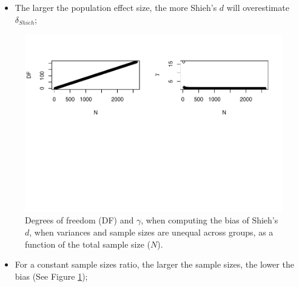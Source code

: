 \documentclass[
  english,
  man,mask]{apa6}
\providecommand{\tightlist}{%
  \setlength{\itemsep}{0pt}\setlength{\parskip}{0pt}}
\begin{document}
\begin{itemize}
\tightlist
\item
  The larger the population effect size, the more Shieh's \(d\) will overestimate \(\delta_{Shieh}\);
\end{itemize}

\begin{figure}
\centering
\includegraphics{SupMat1_files/figure-latex/biasshiehhetunbalNsize2-1.pdf}
\caption{\label{fig:biasshiehhetunbalNsize2}Degrees of freedom (DF) and \(\gamma\), when computing the bias of Shieh's \(d\), when variances and sample sizes are unequal across groups, as a function of the total sample size (\(N\)).}
\end{figure}

\begin{itemize}
\tightlist
\item
  For a constant sample sizes ratio, the larger the sample sizes, the lower the bias (See Figure \ref{fig:biasshiehhetunbalNsize2});
\end{itemize}
\end{document}
